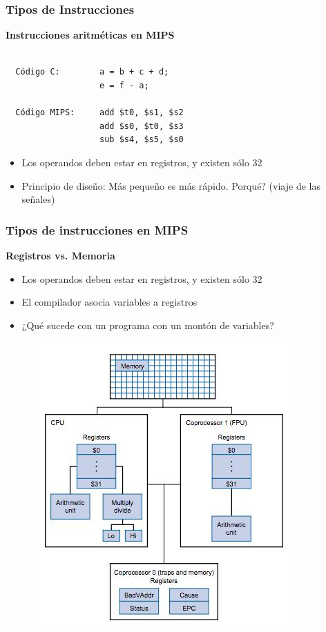 \documentclass[aspectratio=169,compress]{beamer}
\begin{document}
\begin{footnotesize}
\begin{frame}[fragile]
\frametitle{Tipos de Instrucciones}
\begin{center}\textbf{Instrucciones aritméticas en MIPS}\end{center}

\begin{verbatim}

  Código C:        a = b + c + d;
                   e = f - a;

  Código MIPS:     add $t0, $s1, $s2
                   add $s0, $t0, $s3
                   sub $s4, $s5, $s0
\end{verbatim}
\begin{itemize}
\item Los operandos deben estar en registros, y existen sólo 32
\item Principio de diseño: Más pequeño es más rápido. Porqué? (viaje de las señales)
\end{itemize}
\end{frame}





\begin{frame}
\frametitle{Tipos de instrucciones en MIPS}
\begin{center}\textbf{Registros vs. Memoria}\end{center}

\begin{itemize}
\item Los operandos deben estar en registros, y existen sólo 32
\item El compilador asocia variables a registros
\item ¿Qué sucede con un programa con un montón de variables?
\end{itemize}
\begin{center}
\begin{figure}
\includegraphics[scale=0.4]{images/organizacion-mips.jpg} 
\end{figure}
\end{center}
\end{frame}



\end{footnotesize}
\end{document}
